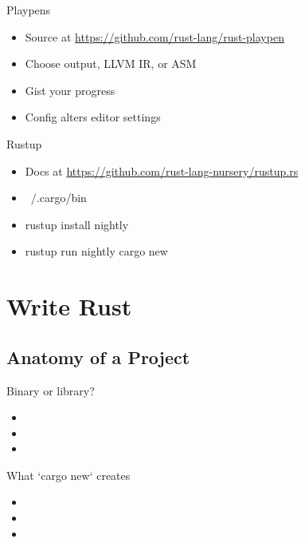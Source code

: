\documentclass[xcolor={svgnames},hyperref]{beamer}
\begin{document}
    \begin{frame}
        Playpens
        \begin{itemize}
            \item Source at \url{https://github.com/rust-lang/rust-playpen}
            \item Choose output, LLVM IR, or ASM
            \item Gist your progress
            \item Config alters editor settings
        \end{itemize}
    \end{frame}

    \begin{frame}
        Rustup
        \begin{itemize}
            \item Docs at \url{https://github.com/rust-lang-nursery/rustup.rs}
            \item ~/.cargo/bin
            \item rustup install nightly
            \item rustup run nightly cargo new
        \end{itemize}
    \end{frame}





\section{Write Rust}

\subsection{Anatomy of a Project}

    \begin{frame}
        Binary or library?
        \begin{itemize}
            \item
            \item
            \item
        \end{itemize}
    \end{frame}

    \begin{frame}
        What `cargo new` creates
        \begin{itemize}
            \item
            \item
            \item
        \end{itemize}
    \end{frame}
\end{document}
